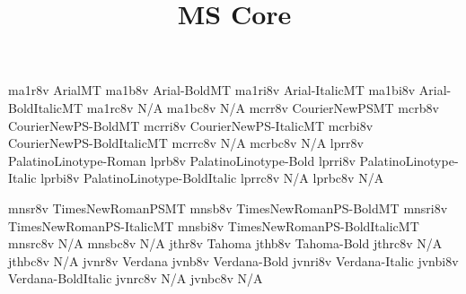 \documentclass[test]{vnsample}
\title{MS Core}
\begin{document}
\begin{shortsample}
  {ma1r8v}  {ArialMT}
  {ma1b8v}  {Arial-BoldMT}
 {ma1ri8v} {Arial-ItalicMT}
 {ma1bi8v} {Arial-BoldItalicMT}
 {ma1rc8v} {N/A}
 {ma1bc8v} {N/A}
  {mcrr8v}  {CourierNewPSMT}
  {mcrb8v}  {CourierNewPS-BoldMT}
 {mcrri8v} {CourierNewPS-ItalicMT}
 {mcrbi8v} {CourierNewPS-BoldItalicMT}
 {mcrrc8v} {N/A}
 {mcrbc8v} {N/A}
  {lprr8v}  {PalatinoLinotype-Roman}
  {lprb8v}  {PalatinoLinotype-Bold}
 {lprri8v} {PalatinoLinotype-Italic}
 {lprbi8v} {PalatinoLinotype-BoldItalic}
 {lprrc8v} {N/A}
 {lprbc8v} {N/A}
\end{shortsample}
\clearpage
\begin{shortsample}
  {mnsr8v}  {TimesNewRomanPSMT}
  {mnsb8v}  {TimesNewRomanPS-BoldMT}
 {mnsri8v} {TimesNewRomanPS-ItalicMT}
 {mnsbi8v} {TimesNewRomanPS-BoldItalicMT}
 {mnsrc8v} {N/A}
 {mnsbc8v} {N/A}
  {jthr8v}  {Tahoma}
  {jthb8v}  {Tahoma-Bold}
 {jthrc8v} {N/A}
 {jthbc8v} {N/A}
  {jvnr8v}  {Verdana}
  {jvnb8v}  {Verdana-Bold}
 {jvnri8v} {Verdana-Italic}
 {jvnbi8v} {Verdana-BoldItalic}
 {jvnrc8v} {N/A}
 {jvnbc8v} {N/A}
\end{shortsample}
\end{document}
